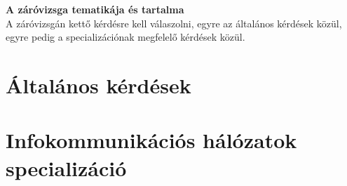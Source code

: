 \def\PAPER{a4paper} %
\def\FONTSIZE{10pt} %
\def\OPTIONS{twoside} %
\def\TARSSZERZO{} %



\setlength{\parskip}{6pt plus 3pt minus 3pt} %
\setcounter{tocdepth}{3} %


\maketitle
%
\textbf{ A záróvizsga tematikája és tartalma}\\
A záróvizsgán kettő kérdésre kell válaszolni, egyre az általános kérdések közül, egyre pedig a specializációnak megfelelő kérdések közül.
\tableofcontents
\cleardoublepage
\part{Általános kérdések}
\cleardoublepage

\part[Infokommunikációs hálózatok]{Infokommunikációs hálózatok specializáció}







%
%
%
%
%
%

%
%
%
%
%
%

\printindex{}
